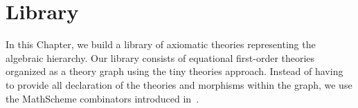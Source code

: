 \chapter{Library}
\label{ch:library}

In this Chapter, we build a library of axiomatic theories representing the algebraic hierarchy. 
Our library consists of equational first-order theories organized as a theory graph using the tiny theories approach. Instead of having to provide all declaration of the theories and morphisms within the graph, we use the MathScheme combinators introduced in~\cite{CaretteOConnorTPC, carette2018building}. 

